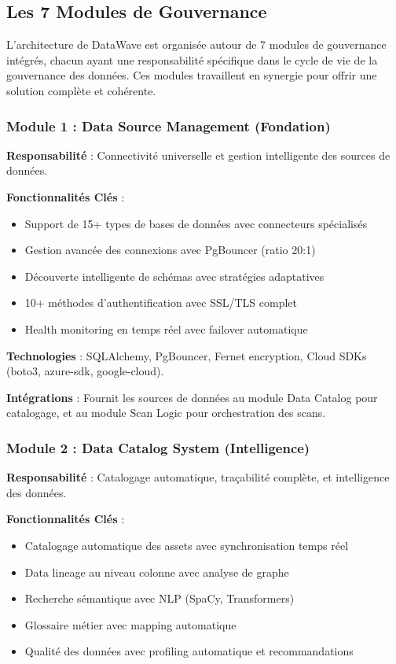\subsection{Les 7 Modules de Gouvernance}

L'architecture de DataWave est organisée autour de 7 modules de gouvernance intégrés, chacun ayant une responsabilité spécifique dans le cycle de vie de la gouvernance des données. Ces modules travaillent en synergie pour offrir une solution complète et cohérente.

\subsubsection{Module 1 : Data Source Management (Fondation)}

\textbf{Responsabilité} : Connectivité universelle et gestion intelligente des sources de données.

\textbf{Fonctionnalités Clés} :
\begin{itemize}
    \item Support de 15+ types de bases de données avec connecteurs spécialisés
    \item Gestion avancée des connexions avec PgBouncer (ratio 20:1)
    \item Découverte intelligente de schémas avec stratégies adaptatives
    \item 10+ méthodes d'authentification avec SSL/TLS complet
    \item Health monitoring en temps réel avec failover automatique
\end{itemize}

\textbf{Technologies} : SQLAlchemy, PgBouncer, Fernet encryption, Cloud SDKs (boto3, azure-sdk, google-cloud).

\textbf{Intégrations} : Fournit les sources de données au module Data Catalog pour catalogage, et au module Scan Logic pour orchestration des scans.

\subsubsection{Module 2 : Data Catalog System (Intelligence)}

\textbf{Responsabilité} : Catalogage automatique, traçabilité complète, et intelligence des données.

\textbf{Fonctionnalités Clés} :
\begin{itemize}
    \item Catalogage automatique des assets avec synchronisation temps réel
    \item Data lineage au niveau colonne avec analyse de graphe
    \item Recherche sémantique avec NLP (SpaCy, Transformers)
    \item Glossaire métier avec mapping automatique
    \item Qualité des données avec profiling automatique et recommandations
\end{itemize}

